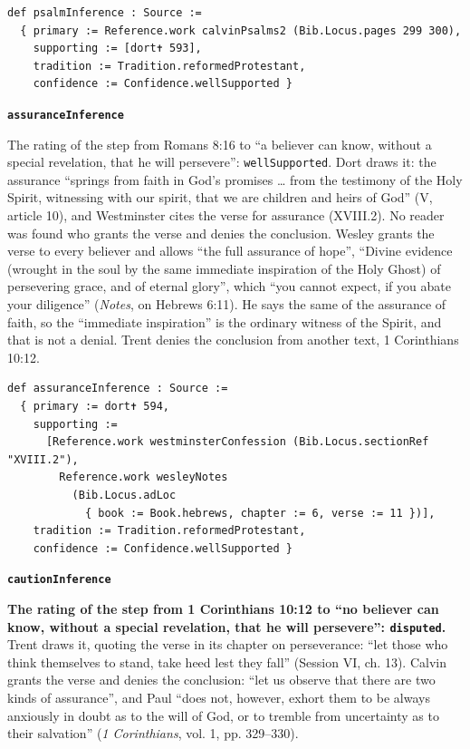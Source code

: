 \documentclass[11pt]{article}
\begin{document}
{\small\begin{verbatim}
def psalmInference : Source :=
  { primary := Reference.work calvinPsalms2 (Bib.Locus.pages 299 300),
    supporting := [dort✝ 593],
    tradition := Tradition.reformedProtestant,
    confidence := Confidence.wellSupported }
\end{verbatim}}
\par\medskip\noindent\textbf{\texttt{assurance\allowbreak{}Inference}}\par\nobreak\noindent
The rating of the step from Romans 8:16 to “a believer can know, without a special revelation, that he will persevere”: \texttt{well\allowbreak{}Supported}. Dort draws it: the assurance “springs from faith in God’s promises … from the testimony of the Holy Spirit, witnessing with our spirit, that we are children and heirs of God” (V, article 10), and Westminster cites the verse for assurance (XVIII.2). No reader was found who grants the verse and denies the conclusion. Wesley grants the verse to every believer and allows “the full assurance of hope”, “Divine evidence (wrought in the soul by the same immediate inspiration of the Holy Ghost) of persevering grace, and of eternal glory”, which “you cannot expect, if you abate your diligence” (\emph{Notes}, on Hebrews 6:11). He says the same of the assurance of faith, so the “immediate inspiration” is the ordinary witness of the Spirit, and that is not a denial. Trent denies the conclusion from another text, 1 Corinthians 10:12.

{\small\begin{verbatim}
def assuranceInference : Source :=
  { primary := dort✝ 594,
    supporting :=
      [Reference.work westminsterConfession (Bib.Locus.sectionRef "XVIII.2"),
        Reference.work wesleyNotes
          (Bib.Locus.adLoc
            { book := Book.hebrews, chapter := 6, verse := 11 })],
    tradition := Tradition.reformedProtestant,
    confidence := Confidence.wellSupported }
\end{verbatim}}
\par\medskip\noindent\textbf{\texttt{caution\allowbreak{}Inference}}\par\nobreak\noindent
\textbf{The rating of the step from 1 Corinthians 10:12 to “no believer can know, without a special revelation, that he will persevere”: \texttt{disputed}.} Trent draws it, quoting the verse in its chapter on perseverance: “let those who think themselves to stand, take heed lest they fall” (Session VI, ch. 13). Calvin grants the verse and denies the conclusion: “let us observe that there are two kinds of assurance”, and Paul “does not, however, exhort them to be always anxiously in doubt as to the will of God, or to tremble from uncertainty as to their salvation” (\emph{1 Corinthians}, vol. 1, pp. 329–330).
\end{document}
